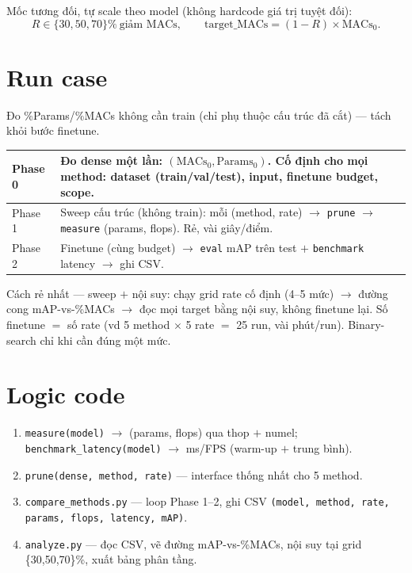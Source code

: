 \documentclass[11pt,a4paper]{article}
\newcommand{\code}[1]{\texttt{#1}}
\begin{document}
Mốc tương đối, tự scale theo model (không hardcode giá trị tuyệt đối):
\[
  R \in \{30,50,70\}\%\ \text{giảm MACs}, \qquad \text{target\_MACs} = (1-R)\times \text{MACs}_0.
\]

\section{Run case}

Đo \%Params/\%MACs không cần train (chỉ phụ thuộc cấu trúc đã cắt) --- tách khỏi bước finetune.

\renewcommand{\arraystretch}{1.35}
\begin{tabularx}{\textwidth}{|p{1.7cm}|Y|}
\hline
Phase 0 & Đo dense một lần: $(\text{MACs}_0, \text{Params}_0)$. Cố định cho mọi method: dataset (train/val/test), input, finetune budget, scope.\\
\hline
Phase 1 & Sweep cấu trúc (không train): mỗi (method, rate) $\to$ \code{prune} $\to$ \code{measure} (params, flops). Rẻ, vài giây/điểm.\\
\hline
Phase 2 & Finetune (cùng budget) $\to$ \code{eval} mAP trên test $+$ \code{benchmark} latency $\to$ ghi CSV.\\
\hline
\end{tabularx}

\medskip
Cách rẻ nhất --- sweep $+$ nội suy: chạy grid rate cố định (4--5 mức) $\to$ đường cong mAP-vs-\%MACs
$\to$ đọc mọi target bằng nội suy, không finetune lại. Số finetune $=$ số rate (vd 5 method $\times$ 5
rate $=$ 25 run, vài phút/run). Binary-search chỉ khi cần đúng một mức.

\section{Logic code}

\begin{enumerate}
  \item \code{measure(model)} $\to$ (params, flops) qua thop $+$ numel; \code{benchmark\_latency(model)} $\to$ ms/FPS (warm-up $+$ trung bình).
  \item \code{prune(dense, method, rate)} --- interface thống nhất cho 5 method.
  \item \code{compare\_methods.py} --- loop Phase 1--2, ghi CSV \code{(model, method, rate, params, flops, latency, mAP)}.
  \item \code{analyze.py} --- đọc CSV, vẽ đường mAP-vs-\%MACs, nội suy tại grid \{30,50,70\}\%, xuất bảng phân tầng.
\end{enumerate}
\end{document}
